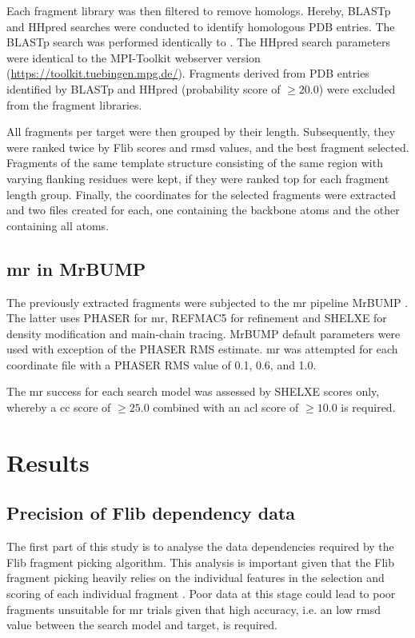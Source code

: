 Each fragment library was then filtered to remove homologs. Hereby, BLASTp and HHpred \cite{Soding2005-sx} searches were conducted to identify homologous PDB entries. The BLASTp search was performed identically to \cite{De_Oliveira2015-ba}. The HHpred search parameters were identical to the MPI-Toolkit \cite{Biegert2006-ny} webserver version (\url{https://toolkit.tuebingen.mpg.de/}). Fragments derived from PDB entries identified by BLASTp and HHpred (probability score of $\geq20.0$) were excluded from the fragment libraries.

All fragments per target were then grouped by their length. Subsequently, they were ranked twice by Flib scores and \gls{rmsd} values, and the best fragment selected. Fragments of the same template structure consisting of the same region with varying flanking residues were kept, if they were ranked top for each fragment length group. Finally, the coordinates for the selected fragments were extracted and two files created for each, one containing the backbone atoms and the other containing all atoms.

\subsection{\acrlong{mr} in MrBUMP}
The previously extracted fragments were subjected to the \gls{mr} pipeline MrBUMP \cite{Keegan2008-hk}. The latter uses PHASER \cite{McCoy2007-bf} for \gls{mr}, REFMAC5 \cite{Murshudov2011-we} for refinement and SHELXE \cite{Thorn2013-ir} for density modification and main-chain tracing. MrBUMP default parameters were used with exception of the PHASER RMS estimate. \gls{mr} was attempted for each coordinate file with a PHASER RMS value of 0.1, 0.6, and 1.0.

The \gls{mr} success for each search model was assessed by SHELXE scores only, whereby a \gls{cc} score of $\geq25.0$ combined with an \gls{acl} score of $\geq10.0$ is required.


\section{Results}
\subsection{Precision of Flib dependency data}
The first part of this study is to analyse the data dependencies required by the Flib fragment picking algorithm. This analysis is important given that the Flib fragment picking heavily relies on the individual features in the selection and scoring of each individual fragment \cite{De_Oliveira2015-ba}. Poor data at this stage could lead to poor fragments unsuitable for \gls{mr} trials given that high accuracy, i.e. an low \gls{rmsd} value between the search model and target, is required.

